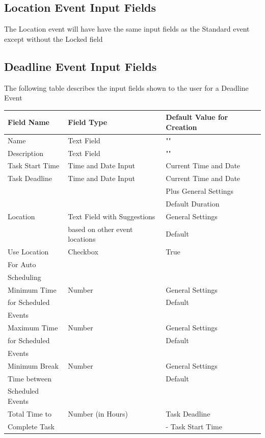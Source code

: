 \documentclass{scrreprt}
\begin{document}
\subsection{Location Event Input Fields}
The Location event will have have the same input fields as the Standard event except without the Locked field

\subsection{Deadline Event Input Fields}
The following table describes the input fields shown to the user for a Deadline Event

\begin{center}
\begin{longtable}{ | p{3cm} | p{8cm} | p{4cm} | }
\hline
\textbf{Field Name} & \textbf{Field Type} & \textbf{Default Value for Creation} \\
\hline
Name & Text Field & "" \\
\hline
Description & Text Field & "" \\
\hline
Task Start Time & Time and Date Input & Current Time and Date \\
\hline
Task Deadline & Time and Date Input & Current Time and Date \\
& & Plus General Settings \\
& & Default Duration \\
\hline
Location & Text Field with Suggestions & General Settings \\
& based on other event locations & Default \\
\hline
Use Location & Checkbox & True \\
For Auto & & \\
Scheduling & & \\
\hline
Minimum Time & Number & General Settings \\
for Scheduled & & Default\\
Events & & \\
\hline
Maximum Time & Number & General Settings \\
for Scheduled & & Default\\
Events & & \\
\hline
Minimum Break & Number & General Settings \\
Time between & & Default\\
 Scheduled Events & & \\
\hline
Total Time to & Number (in Hours) & Task Deadline \\
Complete Task & & - Task Start Time \\
\hline
\end{longtable}
\end{center}
\end{document}
